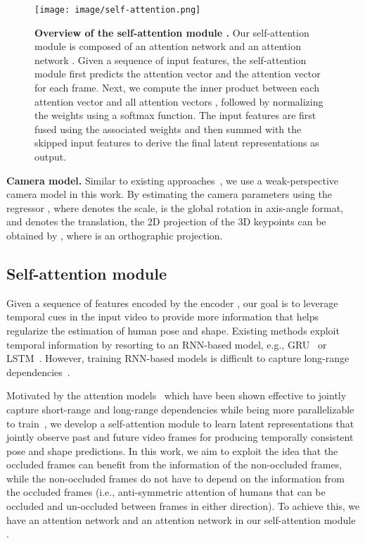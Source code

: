 \documentclass[times,referee,twocolumn,final,authoryear]{elsarticle}
\newcommand{\revised}[1]{{{#1}}}
\newcommand{\heading}[1]{\noindent\textbf{#1}}
\begin{document}
\begin{figure*}[h]
  \begin{center}
    \texttt{[image: image/self-attention.png]}
  \end{center}
  \vspace{-6.0mm}
  \caption{
\textbf{Overview of the self-attention module .}
\revised{
  Our self-attention module  is composed of an attention network  and an attention network .
Given a sequence of input features, the self-attention module first predicts the attention vector  and the attention vector  for each frame.
Next, we compute the inner product between each attention vector  and all attention vectors , followed by normalizing the weights using a softmax function.
The input features are first fused using the associated weights and then summed with the skipped input features to derive the final latent representations as output.
}
}
  \label{fig:self-attention}
  \vspace{-4.0mm}
\end{figure*}

\heading{Camera model.}
Similar to existing approaches~\citep{HMR,SPIN,VIBE}, we use a weak-perspective camera model in this work.
By estimating the camera parameters  using the regressor , where  denotes the scale,  is the global rotation in axis-angle format, and  denotes the translation, the 2D projection  of the 3D keypoints  can be obtained by , where  is an orthographic projection. 

\vspace{-2.5mm}
\subsection{Self-attention module}

Given a sequence of features  encoded by the encoder , our goal is to leverage temporal cues in the input video to provide more information that helps regularize the estimation of human pose and shape.
Existing methods exploit temporal information by resorting to an RNN-based model, e.g., GRU~\citep{VIBE} or LSTM~\citep{lee2018propagating,rayat2018exploiting}.
However, training RNN-based models is difficult to capture long-range dependencies~\citep{transformer,pascanu2013difficulty}.

Motivated by the attention models~\citep{transformer,SAGAN,parmar2018image} which have been shown effective to jointly capture short-range and long-range dependencies while being more parallelizable to train~\citep{transformer}, we develop a self-attention module to learn latent representations  that jointly observe past and future video frames for producing temporally consistent pose and shape predictions.
\revised{
In this work, we aim to exploit the idea that the occluded frames can benefit from the information of the non-occluded frames, while the non-occluded frames do not have to depend on the information from the occluded frames (i.e., anti-symmetric attention of humans that can be occluded and un-occluded between frames in either direction).
To achieve this, we have an attention network  and an attention network  in our self-attention module .
}
\end{document}
